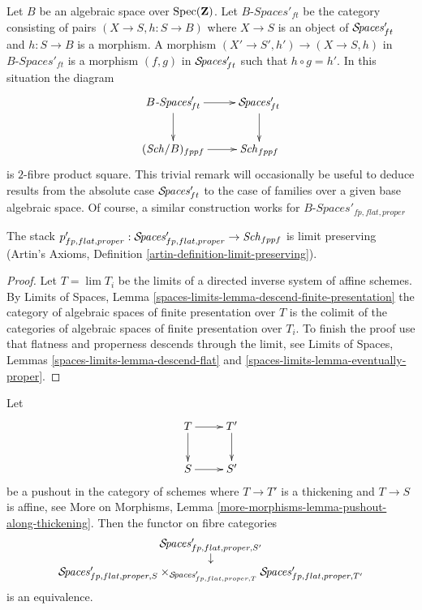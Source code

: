 \begin{remark}
\label{remark-spaces-base-change}
Let $B$ be an algebraic space over $\mathop{\mathrm{Spec}}(\mathbf{Z})$.
Let $B\textit{-Spaces}'_{ft}$ be the category consisting
of pairs $(X \to S, h : S \to B)$
where $X \to S$ is an object of
$\mathcal{S}\!\mathit{paces}'_{ft}$ and $h : S \to B$ is a morphism.
A morphism $(X' \to S', h') \to (X \to S, h)$
in $B\textit{-Spaces}'_{ft}$ is a morphism $(f, g)$
in $\mathcal{S}\!\mathit{paces}'_{ft}$ such that $h \circ g = h'$.
In this situation the diagram
$$
\xymatrix{
B\textit{-Spaces}'_{ft} \ar[r] \ar[d] & \Spacesstack'_{ft} \ar[d] \\
(\Sch/B)_{fppf} \ar[r] & \Sch_{fppf}
}
$$
is $2$-fibre product square. This trivial remark
will occasionally be useful to deduce results from
the absolute case $\mathcal{S}\!\mathit{paces}'_{ft}$ to the case
of families over a given base algebraic space.
Of course, a similar construction works for
$B\textit{-Spaces}'_{fp, flat, proper}$
\end{remark}

\begin{lemma}
\label{lemma-spaces-limits}
The stack
$p'_{fp, flat, proper} :
\mathcal{S}\!\mathit{paces}'_{fp, flat, proper} \to \mathit{Sch}_{fppf}$ is limit preserving
(Artin's Axioms, Definition \ref{artin-definition-limit-preserving}).
\end{lemma}

\begin{proof}
Let $T = \lim T_i$ be the limits of a
directed inverse system of affine schemes.
By Limits of Spaces, Lemma
\ref{spaces-limits-lemma-descend-finite-presentation}
the category of algebraic spaces of finite presentation
over $T$ is the colimit of the categories of algebraic spaces
of finite presentation over $T_i$.
To finish the proof use that flatness and properness
descends through the limit, see
Limits of Spaces, Lemmas
\ref{spaces-limits-lemma-descend-flat} and
\ref{spaces-limits-lemma-eventually-proper}.
\end{proof}

\begin{lemma}
\label{lemma-spaces-RS-star}
Let
$$
\xymatrix{
T \ar[r] \ar[d] & T' \ar[d] \\
S \ar[r] & S'
}
$$
be a pushout in the category of schemes where
$T \to T'$ is a thickening and $T \to S$ is affine, see
More on Morphisms, Lemma \ref{more-morphisms-lemma-pushout-along-thickening}.
Then the functor on fibre categories
$$
\begin{matrix}
\mathcal{S}\!\mathit{paces}'_{fp, flat, proper, S'} \\
\downarrow \\
\mathcal{S}\!\mathit{paces}'_{fp, flat, proper, S}
\times_{\mathcal{S}\!\mathit{paces}'_{fp, flat, proper, T}}
\mathcal{S}\!\mathit{paces}'_{fp, flat, proper, T'}
\end{matrix}
$$
is an equivalence.
\end{lemma}

